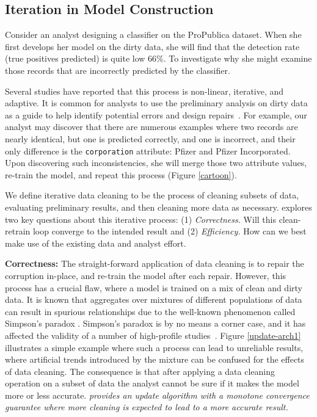 \subsection{Iteration in Model Construction}\label{alcmp}
Consider an analyst designing a classifier on the ProPublica dataset.
When she first develops her model on the dirty data, she will find that the detection rate (true positives predicted) is quite low 66\%.
To investigate why she might examine those records that are incorrectly predicted by the classifier.

Several studies have reported that this process is non-linear, iterative, and adaptive.
It is common for analysts to use the preliminary analysis on dirty data as a guide to help identify potential errors and design repairs~\cite{kandel2012}.
For example, our analyst may discover that there are numerous examples where two records are nearly identical, but one is predicted correctly, and one is incorrect, and their only difference is the \texttt{corporation} attribute: Pfizer and Pfizer Incorporated.
Upon discovering such inconsistencies, she will merge those two attribute values, re-train the model, and repeat this process (Figure \ref{cartoon}).

We define iterative data cleaning to be the process of cleaning subsets of data, evaluating preliminary results, and then cleaning more data as necessary.
\sys explores two key questions about this iterative process: (1) \emph{Correctness.} Will this clean-retrain loop converge to the intended result and (2) \emph{Efficiency.} How can we best make use of the existing data and analyst effort.

\vspace{0.5em}
\noindent \textbf{Correctness: } The straight-forward application of data cleaning is to repair the corruption in-place, and re-train the model after each repair.
However, this process has a crucial flaw, where a model is trained on a mix of clean and dirty data.
It is known that aggregates over mixtures of different populations of data can result in spurious relationships due to the well-known phenomenon called Simpson's paradox \cite{simpson1951interpretation}.
Simpson's paradox is by no means a corner case, and it has affected the validity of a number of high-profile studies~\cite{pearl2003causality}.
Figure \ref{update-arch1} illustrates a simple example where such a process can lead to unreliable results, where artificial trends introduced by the mixture can be confused for the effects of data cleaning.
The consequence is that after applying a data cleaning operation on a subset of data the analyst cannot be sure if it makes the model more or less accurate.
\emph{\sys provides an update algorithm with a monotone convergence guarantee where more cleaning is expected to lead to a more accurate result.}

